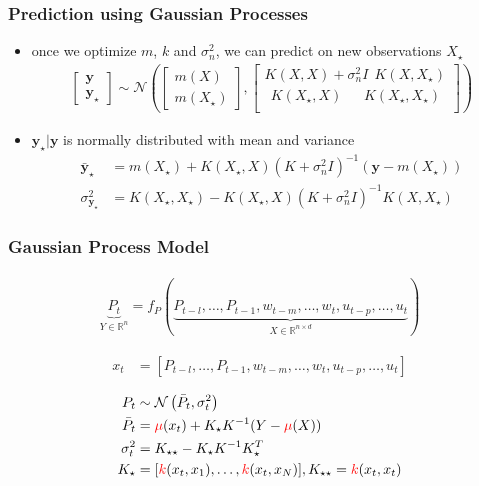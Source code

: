 \begin{frame}[t]
	
	\frametitle{Prediction using Gaussian Processes}
	
	
	\begin{itemize}
		\item once we optimize \(m\), \(k\) and \(\sigma_n^2\), we can predict on new observations \(X_\star\)
		\begin{align*}
		\begin{bmatrix}
		\mathbf{y} \\
		\mathbf{y}_\star
		\end{bmatrix} \sim \mathcal{N} \left(
		\begin{bmatrix}
		m(X) \\
		m(X_\star)
		\end{bmatrix},
		\begin{bmatrix}
		K(X,X)+\sigma_n^2I \ \ K(X,X_\star) \\
		\ \ K(X_\star,X) \ \ \ \ \ \ \ K(X_\star,X_\star) \\
		\end{bmatrix}
		 \right)
		\end{align*}
		\item \(\mathbf{y}_\star|\mathbf{y}\) is normally distributed with mean and variance
		\begin{align*}
		\bar{\mathbf{y}}_\star &= m(X_\star) + K(X_\star,X){(K+\sigma_n^2I)}^{-1} (\mathbf{y}-m(X_\star))\\
		\sigma^2_{\mathbf{y}_\star} &= K(X_\star,X_\star) - K(X_\star,X){(K+\sigma_n^2I)}^{-1} K(X,X_\star)
		\end{align*}
	\end{itemize}
	
\end{frame}


\begin{frame}[t]
	
	\frametitle{Gaussian Process Model}
	
	\begin{align*}
	\underbrace{P_t}_{Y \in \mathbb{R}^n} = f_P(\underbrace{P_{t-l}, \dots, P_{t-1}, w_{t-m}, \dots, w_{t}, u_{t-p}, \dots, u_{t}}_{X \in \mathbb{R}^{n \times d}})
	\end{align*}
	
	\begin{align*}
		x_{t} &= [P_{t-l}, \dots, P_{t-1}, w_{t-m}, \dots, w_t, u_{t-p}, \dots, u_t]
	\end{align*}
	
	\begin{align*}
	P_t &\sim \operatorname*{\mathcal{N}}\left(\bar{P}_{t}, \sigma^2_{t}\right) \\
	\bar{P}_{t} &= \color{red}\mu \color{black} (x_{t}) + K_\star K^{-1} (Y -\color{red}\mu \color{black}(X)) \\
	\sigma^2_{t} &= K_{\star \star} - K_\star K^{-1} K_\star^T \\
	K_\star &= [\color{red}k\color{black}(x_{t}, x_1), \dots, \color{red}k\color{black}(x_{t}, x_N)], K_{\star \star} = \color{red}k\color{black}(x_{t}, x_{t})
	\end{align*}
	
\end{frame}
